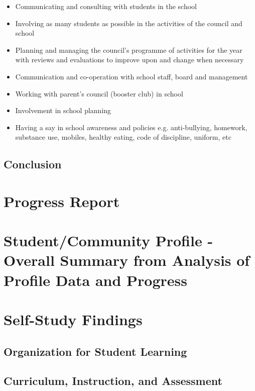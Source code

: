\documentclass{report}
\begin{document}
\begin{itemize}
\item Communicating and consulting with students in the school
\item Involving as many students as possible in the activities of the council and school
\item Planning and managing the council's programme of activities for the year with reviews and evaluations to improve upon and change when necessary
\item Communication and co-operation with school staff, board and management
\item Working with parent's council (booster club) in school
\item Involvement in school planning
\item Having a say in school awareness and policies e.g. anti-bullying, homework, substance use, mobiles, healthy eating, code of discipline, uniform, etc
\end{itemize}

\section{Conclusion}

\chapter{Progress Report}
\chapter[Student/Community Profile Summary]{Student/Community Profile - Overall Summary from Analysis of Profile Data and Progress}
\chapter{Self-Study Findings}

\section{Organization for Student Learning}





\section{Curriculum, Instruction, and Assessment}
\end{document}
